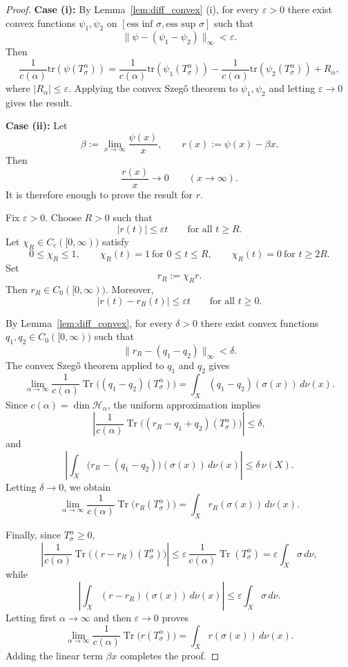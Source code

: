 \documentclass{amsart}
\theoremstyle{definition}
\theoremstyle{remark}
\numberwithin{equation}{section}
\newcommand{\tr}{\text{tr}} %
\newcommand{\calF}{\mathcal{F}}
\begin{document}
\begin{proof}
\textbf{Case (i):} By Lemma~\ref{lem:diff_convex} (i), for every $\varepsilon>0$ there exist convex functions $\psi_1,\psi_2$ on $[\text{ess inf } \sigma, \text{ess sup }\sigma]$ such that
\[
    \|\psi-(\psi_1-\psi_2)\|_\infty < \varepsilon.
\]
Then
\[
    \frac{1}{c(\alpha)} \tr(\psi(T_\sigma^\alpha)) 
    = \frac{1}{c(\alpha)} \tr(\psi_1(T_\sigma^\alpha)) 
      - \frac{1}{c(\alpha)} \tr(\psi_2(T_\sigma^\alpha)) 
      + R_\alpha,
\]
where $|R_\alpha| \le \varepsilon$. Applying the convex Szeg\H{o} theorem to $\psi_1,\psi_2$ and letting $\varepsilon\to 0$ gives the result.

\textbf{Case (ii):} 
Let
\[
\beta:=\lim_{x\to\infty}\frac{\psi(x)}{x},
\qquad
r(x):=\psi(x)-\beta x.
\]
Then
\[
\frac{r(x)}{x}\longrightarrow 0
\qquad (x\to\infty).
\]
It is therefore enough to prove the result for $r$.

Fix $\varepsilon>0$. Choose $R>0$ such that
\[
|r(t)|\leq \varepsilon t
\qquad\text{for all }t\geq R.
\]
Let $\chi_R\in C_c([0,\infty))$ satisfy
\[
0\leq\chi_R\leq 1,\qquad
\chi_R(t)=1\ \text{for }0\leq t\leq R,\qquad
\chi_R(t)=0\ \text{for }t\geq 2R.
\]
Set
\[
r_R:=\chi_R r.
\]
Then $r_R\in C_0([0,\infty))$. Moreover,
\[
|r(t)-r_R(t)|\leq \varepsilon t
\qquad\text{for all }t\geq 0.
\]

By Lemma~\ref{lem:diff_convex}, for every $\delta>0$ there exist convex functions
$q_1,q_2\in C_0([0,\infty))$ such that
\[
\|r_R-(q_1-q_2)\|_\infty<\delta.
\]
The convex Szegő theorem applied to $q_1$ and $q_2$ gives
\[
\lim_{\alpha\to\infty}
\frac{1}{c(\alpha)}
\operatorname{Tr}\bigl((q_1-q_2)(T_\sigma^\alpha)\bigr)
=
\int_X(q_1-q_2)(\sigma(x))\,d\nu(x).
\]
Since $c(\alpha)=\dim\mathcal H_\alpha$, the uniform approximation implies
\[
\left|
\frac{1}{c(\alpha)}
\operatorname{Tr}\bigl((r_R-q_1+q_2)(T_\sigma^\alpha)\bigr)
\right|
\leq \delta,
\]
and
\[
\left|
\int_X
\bigl(r_R-(q_1-q_2)\bigr)(\sigma(x))\,d\nu(x)
\right|
\leq \delta\,\nu(X).
\]
Letting $\delta\to0$, we obtain
\[
\lim_{\alpha\to\infty}
\frac{1}{c(\alpha)}
\operatorname{Tr}\bigl(r_R(T_\sigma^\alpha)\bigr)
=
\int_X r_R(\sigma(x))\,d\nu(x).
\]

Finally, since $T_\sigma^\alpha\geq0$,
\[
\left|
\frac{1}{c(\alpha)}
\operatorname{Tr}\bigl((r-r_R)(T_\sigma^\alpha)\bigr)
\right|
\leq
\varepsilon\,
\frac{1}{c(\alpha)}
\operatorname{Tr}(T_\sigma^\alpha)
=
\varepsilon\int_X\sigma\,d\nu,
\]
while
\[
\left|
\int_X(r-r_R)(\sigma(x))\,d\nu(x)
\right|
\leq
\varepsilon\int_X\sigma\,d\nu.
\]
Letting first $\alpha\to\infty$ and then $\varepsilon\to0$ proves
\[
\lim_{\alpha\to\infty}
\frac{1}{c(\alpha)}
\operatorname{Tr}\bigl(r(T_\sigma^\alpha)\bigr)
=
\int_X r(\sigma(x))\,d\nu(x).
\]
Adding the linear term $\beta x$ completes the proof.
\end{proof}
\end{document}
